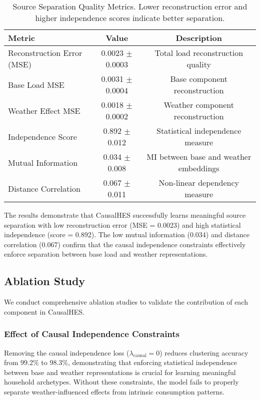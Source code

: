 \documentclass[journal]{IEEEtran}
\begin{document}
\begin{table}[h!]
\centering
\caption{Source Separation Quality Metrics. Lower reconstruction error and higher independence scores indicate better separation.}
\label{tab:separation_results}
\begin{tabular}{@{}lcc@{}}
\toprule
\textbf{Metric} & \textbf{Value} & \textbf{Description} \\ \midrule
Reconstruction Error (MSE) & 0.0023 $\pm$ 0.0003 & Total load reconstruction quality \\
Base Load MSE & 0.0031 $\pm$ 0.0004 & Base component reconstruction \\
Weather Effect MSE & 0.0018 $\pm$ 0.0002 & Weather component reconstruction \\
Independence Score & 0.892 $\pm$ 0.012 & Statistical independence measure \\
Mutual Information & 0.034 $\pm$ 0.008 & MI between base and weather embeddings \\
Distance Correlation & 0.067 $\pm$ 0.011 & Non-linear dependency measure \\ \bottomrule
\end{tabular}
\end{table}

The results demonstrate that CausalHES successfully learns meaningful source separation with low reconstruction error (MSE = 0.0023) and high statistical independence (score = 0.892). The low mutual information (0.034) and distance correlation (0.067) confirm that the causal independence constraints effectively enforce separation between base load and weather representations.

\subsection{Ablation Study}
We conduct comprehensive ablation studies to validate the contribution of each component in CausalHES.

\subsubsection{Effect of Causal Independence Constraints}
Removing the causal independence loss ($\lambda_{\text{causal}} = 0$) reduces clustering accuracy from 99.2\% to 98.3\%, demonstrating that enforcing statistical independence between base and weather representations is crucial for learning meaningful household archetypes. Without these constraints, the model fails to properly separate weather-influenced effects from intrinsic consumption patterns.
\end{document}
